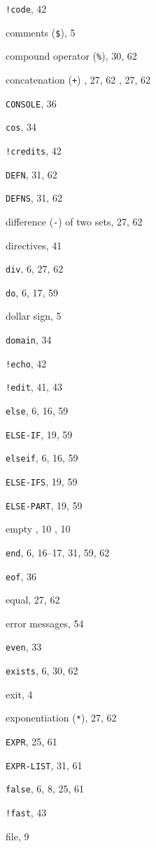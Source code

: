 \begin{theindex}
\item {{\tt !code}}, 42
\item {comments ({\tt \$})}, 5
\item {compound operator ({\tt \%})}, 30, 62
\item {concatenation ({\tt +})}
	, 27, 62
	, 27, 62
\item {{\tt CONSOLE}}, 36
\item {{\tt cos}}, 34
\item {{\tt !credits}}, 42
\indexspace
\item {{\tt DEFN}}, 31, 62
\item {{\tt DEFNS}}, 31, 62
\item {difference ({\tt -}) of two sets}, 27, 62
\item {directives}, 41
\item {{\tt div}}, 6, 27, 62
\item {{\tt do}}, 6, 17, 59
\item {dollar sign}, 5
\item {{\tt domain}}, 34
\indexspace
\item {{\tt !echo}}, 42
\item {{\tt !edit}}, 41, 43
\item {{\tt else}}, 6, 16, 59
\item {{\tt ELSE-IF}}, 19, 59
\item {{\tt elseif}}, 6, 16, 59
\item {{\tt ELSE-IFS}}, 19, 59
\item {{\tt ELSE-PART}}, 19, 59
\item {empty}
	, 10
	, 10
\item {{\tt end}}, 6, 16--17, 31, 59, 62
\item {{\tt eof}}, 36
\item {equal}, 27, 62
\item {error messages}, 54
\item {{\tt even}}, 33
\item {{\tt exists}}, 6, 30, 62
\item {exit}, 4
\item {exponentiation ({\tt **})}, 27, 62
\item {{\tt EXPR}}, 25, 61
\item {{\tt EXPR-LIST}}, 31, 61
\indexspace
\item {{\tt false}}, 6, 8, 25, 61
\item {{\tt !fast}}, 43
\item {file}, 9

\end{theindex}
